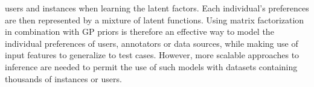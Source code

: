 users and instances when learning the latent factors. 
Each individual's preferences are then represented 
by a mixture of latent functions.
Using matrix factorization in combination with GP priors is therefore an effective
way to model the individual preferences of users, annotators or data sources, while
making use of input features to generalize to test cases. However,
more scalable approaches to inference are needed to permit the use of such 
models with datasets containing thousands of instances or users.



